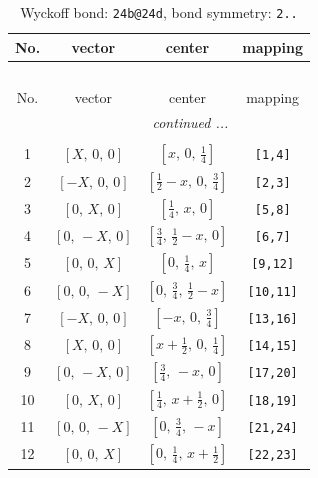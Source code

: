 \documentclass[fleqn,8pt]{jsarticle}
\begin{document}
\renewcommand{\arraystretch}{1.2}
\begin{longtable}{cccc}
\caption{Wyckoff bond: {\tt 24b@24d}, bond symmetry: {\tt 2..}}
 \\
 \hline \hline
No. & vector & center & mapping \\ \hline \endfirsthead

\multicolumn{3}{l}{\tablename\ \thetable{}} \\
 \hline \hline
No. & vector & center & mapping \\ \hline \endhead

 \hline \hline
\multicolumn{3}{r}{\footnotesize\it continued ...} \\ \endfoot

 \hline \hline
\multicolumn{3}{r}{} \\ \endlastfoot

1 & $\left[ X,\, 0,\, 0 \right]$ & $\left[ x,\, 0,\, \frac{1}{4} \right]$ & {\tt [1,4]} \\ \hline
2 & $\left[ - X,\, 0,\, 0 \right]$ & $\left[ \frac{1}{2} - x,\, 0,\, \frac{3}{4} \right]$ & {\tt [2,3]} \\ \hline
3 & $\left[ 0,\, X,\, 0 \right]$ & $\left[ \frac{1}{4},\, x,\, 0 \right]$ & {\tt [5,8]} \\ \hline
4 & $\left[ 0,\, - X,\, 0 \right]$ & $\left[ \frac{3}{4},\, \frac{1}{2} - x,\, 0 \right]$ & {\tt [6,7]} \\ \hline
5 & $\left[ 0,\, 0,\, X \right]$ & $\left[ 0,\, \frac{1}{4},\, x \right]$ & {\tt [9,12]} \\ \hline
6 & $\left[ 0,\, 0,\, - X \right]$ & $\left[ 0,\, \frac{3}{4},\, \frac{1}{2} - x \right]$ & {\tt [10,11]} \\ \hline
7 & $\left[ - X,\, 0,\, 0 \right]$ & $\left[ - x,\, 0,\, \frac{3}{4} \right]$ & {\tt [13,16]} \\ \hline
8 & $\left[ X,\, 0,\, 0 \right]$ & $\left[ x + \frac{1}{2},\, 0,\, \frac{1}{4} \right]$ & {\tt [14,15]} \\ \hline
9 & $\left[ 0,\, - X,\, 0 \right]$ & $\left[ \frac{3}{4},\, - x,\, 0 \right]$ & {\tt [17,20]} \\ \hline
10 & $\left[ 0,\, X,\, 0 \right]$ & $\left[ \frac{1}{4},\, x + \frac{1}{2},\, 0 \right]$ & {\tt [18,19]} \\ \hline
11 & $\left[ 0,\, 0,\, - X \right]$ & $\left[ 0,\, \frac{3}{4},\, - x \right]$ & {\tt [21,24]} \\ \hline
12 & $\left[ 0,\, 0,\, X \right]$ & $\left[ 0,\, \frac{1}{4},\, x + \frac{1}{2} \right]$ & {\tt [22,23]} \\
\end{longtable}
\end{document}
